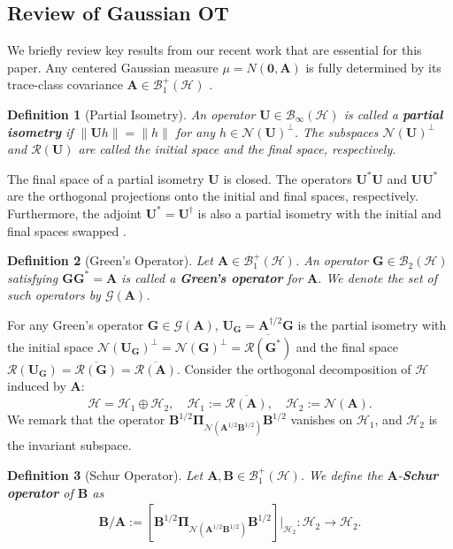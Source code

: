 \documentclass[noinfoline]{imsart}\setcounter{tocdepth}{2}
\newcommand{\m}[1]{\mathbf{#1}}
\renewcommand{\c}[1]{\mathcal{#1}}
\theoremstyle{plain}
\newtheorem{definition}{Definition}[section]
\begin{document}
\subsection{Review of Gaussian OT}\label{ssec:rev:OT}
We briefly review key results from our recent work \cite{yun2025gaussian} that are essential for this paper. Any centered Gaussian measure $\mu = N(\m{0}, \m{A})$ is fully determined by its trace-class covariance $\m{A} \in \c{B}_{1}^{+}(\c{H})$ \cite{da2006introduction}.

\begin{definition}[Partial Isometry]
An operator $\m{U} \in \c{B}_{\infty}(\c{H})$ is called a \textbf{partial isometry} if $\|\m{U} h \| = \|h \|$ for any $h \in \c{N}(\m{U})^{\perp}$. The subspaces $\c{N}(\m{U})^{\perp}$ and $\c{R}(\m{U})$ are called the \emph{initial space} and the \emph{final space}, respectively.
\end{definition}

The final space of a partial isometry $\m{U}$ is closed. The operators $\m{U}^{*} \m{U}$ and $\m{U} \m{U}^{*}$ are the orthogonal projections onto the initial and final spaces, respectively. Furthermore, the adjoint $\m{U}^{*} = \m{U}^{\dagger}$ is also a partial isometry with the initial and final spaces swapped \cite{conway2019course}.


\begin{definition}[Green's Operator]\label{def:Green's}
Let $\m{A} \in \c{B}_{1}^{+}(\c{H})$. An operator $\m{G} \in \c{B}_{2}(\c{H})$ satisfying $\m{G} \m{G}^{*} = \m{A}$ is called a \textbf{Green's operator} for $\m{A}$. We denote the set of such operators by $\c{G}(\m{A})$.
\end{definition}
For any Green's operator $\m{G} \in \c{G}(\m{A})$, $\m{U}_{\m{G}} = \m{A}^{\dagger/2} \m{G}$ is the partial isometry with the initial space $\c{N}(\m{U}_{\m{G}})^{\perp} = \c{N}(\m{G})^{\perp} = \overline{\c{R}(\m{G}^{*})}$ and the final space $\c{R}(\m{U}_{\m{G}}) = \overline{\c{R}(\m{G})} = \overline{\c{R}(\m{A})}$.
Consider the orthogonal decomposition of $\c{H}$ induced by $\m{A}$:
\begin{equation*}
    \c{H} = \c{H}_{1} \oplus \c{H}_{2}, \quad \c{H}_{1} := \overline{\c{R}(\m{A})}, \quad \c{H}_{2} := \c{N}(\m{A}).
\end{equation*}
We remark that the operator $\m{B}^{1/2} \m{\Pi}_{\c{N}(\m{A}^{1/2} \m{B}^{1/2})} \m{B}^{1/2}$ vanishes on $\c{H}_{1}$, and $\c{H}_{2}$ is the invariant subspace.
\begin{definition}[Schur Operator]
Let $\m{A}, \m{B} \in \c{B}_{1}^{+}(\c{H})$. We define the $\m{A}$-\textbf{Schur operator} of $\m{B}$ as
\begin{align*}
    \m{B}/\m{A} := [\m{B}^{1/2} \m{\Pi}_{\c{N}(\m{A}^{1/2} \m{B}^{1/2})} \m{B}^{1/2}] \big|_{\c{H}_{2}} : \c{H}_{2} \to \c{H}_{2}.
\end{align*}
\end{definition}
\end{document}
